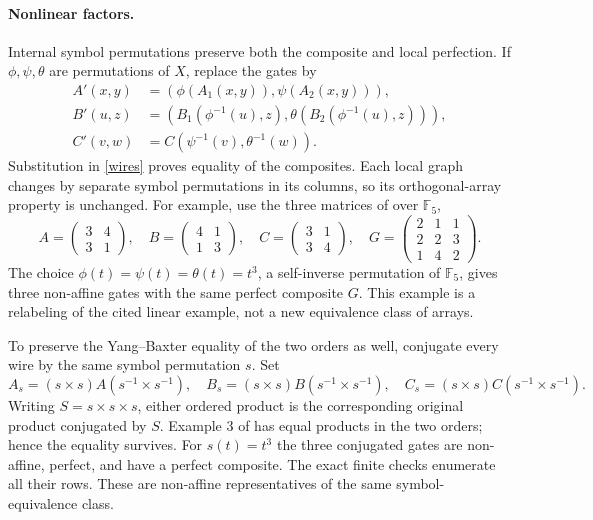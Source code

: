 \documentclass[11pt]{article}
\begin{document}
\paragraph{Nonlinear factors.}
Internal symbol permutations preserve both the composite and local
perfection. If $\phi,\psi,\theta$ are permutations of $X$, replace the
gates by
\begin{align*}
 A'(x,y)&=(\phi(A_1(x,y)),\psi(A_2(x,y))),\\
 B'(u,z)&=(B_1(\phi^{-1}(u),z),
                 \theta(B_2(\phi^{-1}(u),z))),\\
 C'(v,w)&=C(\psi^{-1}(v),\theta^{-1}(w)).
\end{align*}
Substitution in \eqref{wires} proves equality of the composites.
Each local graph changes by separate symbol permutations in its columns,
so its orthogonal-array property is unchanged.
For example, use the three matrices of \cite[Example 3]{PW} over
$\mathbb F_5$,
\[
 A=\begin{pmatrix}3&4\\3&1\end{pmatrix},\quad
 B=\begin{pmatrix}4&1\\1&3\end{pmatrix},\quad
 C=\begin{pmatrix}3&1\\3&4\end{pmatrix},\quad
 G=\begin{pmatrix}2&1&1\\2&2&3\\1&4&2\end{pmatrix}.
\]
The choice $\phi(t)=\psi(t)=\theta(t)=t^3$, a self-inverse permutation
of $\mathbb F_5$, gives three non-affine gates with the same perfect
composite $G$. This example is a relabeling of the cited linear example,
not a new equivalence class of arrays.

To preserve the Yang--Baxter equality of the two orders as well, conjugate
every wire by the same symbol permutation $s$. Set
\[
 A_s=(s\times s)A(s^{-1}\times s^{-1}),
 \quad B_s=(s\times s)B(s^{-1}\times s^{-1}),
 \quad C_s=(s\times s)C(s^{-1}\times s^{-1}).
\]
Writing $S=s\times s\times s$, either ordered product is the
corresponding original product conjugated by $S$. Example 3 of
\cite{PW} has equal products in the two orders; hence the equality
survives. For $s(t)=t^3$ the three conjugated gates are non-affine,
perfect, and have a perfect composite. The exact finite checks enumerate
all their rows. These are non-affine representatives of the same
symbol-equivalence class.
\end{document}
